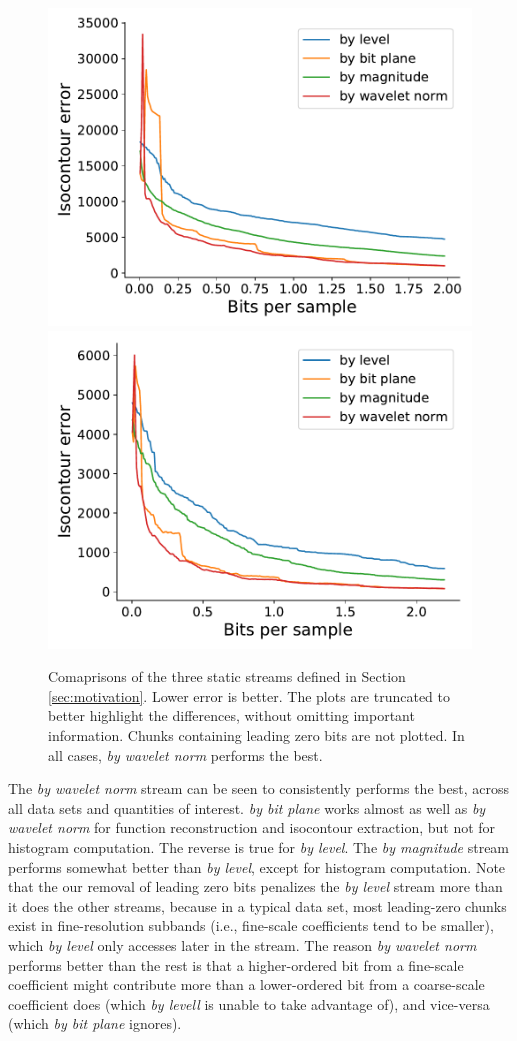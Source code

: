 \begin{figure}[h]
{  {\includegraphics[width=0.48\linewidth]{img/motivation/motivation-isocontour-plasma.pdf}}
  {\includegraphics[width=0.48\linewidth]{img/motivation/motivation-isocontour-turbulence.pdf}}}
  \caption{Comaprisons of the three static streams defined in Section \ref{sec:motivation}. Lower
  error is better. The plots are truncated to better highlight the differences, without omitting
  important information. Chunks containing leading zero bits are not plotted. In all cases, \emph{by
  wavelet norm} performs the best.}
 	\label{fig:motivation-rmse}
\end{figure}

The \emph{by wavelet norm} stream can be seen to consistently performs the best, across all data
sets and quantities of interest. \emph{by bit plane} works almost as well as \emph{by wavelet norm}
for function reconstruction and isocontour extraction, but not for histogram computation. The
reverse is true for \emph{by level}. The \emph{by magnitude} stream performs somewhat better than
\emph{by level}, except for histogram computation. Note that the our removal of leading zero bits
penalizes the \emph{by level} stream more than it does the other streams, because in a typical data
set, most leading-zero chunks exist in fine-resolution subbands (i.e., fine-scale coefficients tend
to be smaller), which \emph{by level} only accesses later in the stream. The reason \emph{by wavelet
norm} performs better than the rest is that a higher-ordered bit from a fine-scale coefficient might
contribute more than a lower-ordered bit from a coarse-scale coefficient does (which \emph{by
levell} is unable to take advantage of), and vice-versa (which \emph{by bit plane} ignores).

